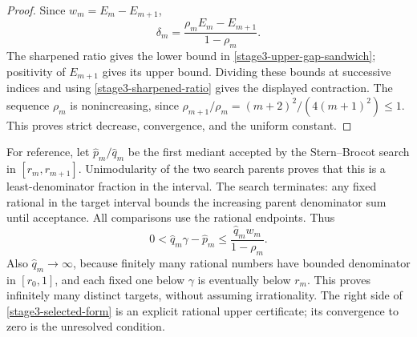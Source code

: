 \documentclass[11pt,a4paper]{article}
\theoremstyle{definition}
\theoremstyle{remark}
\begin{document}
\begin{proof}
Since $w_m=E_m-E_{m+1}$,
\[
 \delta_m=\frac{\rho_m E_m-E_{m+1}}{1-\rho_m}.
\]
The sharpened ratio gives the lower bound in
\eqref{stage3-upper-gap-sandwich}; positivity of $E_{m+1}$ gives its
upper bound. Dividing these bounds at successive indices and using
\eqref{stage3-sharpened-ratio} gives the displayed contraction.
The sequence $\rho_m$ is nonincreasing, since
$\rho_{m+1}/\rho_m=(m+2)^2/(4(m+1)^2)\le1$.
This proves strict decrease, convergence, and the uniform constant.
\end{proof}

For reference, let $\widehat p_m/\widehat q_m$ be the first mediant
accepted by the Stern--Brocot search in $[r_m,r_{m+1}]$. Unimodularity
of the two search parents proves that this is a least-denominator
fraction in the interval. The search terminates: any fixed rational
in the target interval bounds the increasing parent denominator sum
until acceptance. All comparisons use the rational endpoints.
Thus
\begin{equation}\label{stage3-selected-form}
 0<\widehat q_m\gamma-\widehat p_m
 \le\frac{\widehat q_m w_m}{1-\rho_m}.
\end{equation}
Also $\widehat q_m\to\infty$, because finitely many rational numbers
have bounded denominator in $[r_0,1]$, and each fixed one below
$\gamma$ is eventually below $r_m$. This proves infinitely many
distinct targets, without assuming irrationality. The right side of
\eqref{stage3-selected-form} is an explicit rational upper certificate;
its convergence to zero is the unresolved condition.
\end{document}
